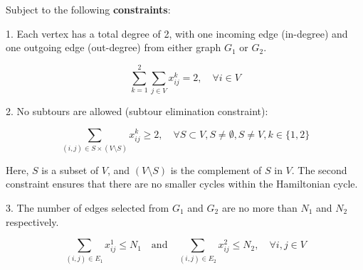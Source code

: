 \documentclass[11pt]{article}
\begin{document}
Subject to the following \textbf{constraints}:

1. Each vertex has a total degree of 2, with one incoming edge (in-degree) and one outgoing edge (out-degree) from either graph $G_1$ or $G_2$.

\begin{equation*}
  \sum_{k=1}^{2} \sum_{j \in V} x_{ij}^k = 2, \quad \forall i \in V
\end{equation*}

2. No subtours are allowed (subtour elimination constraint):

\begin{equation*}
  \sum_{(i,j) \in S \times (V \setminus S)} x_{ij}^k \geq 2, \quad \forall S \subset V, S \neq \emptyset, S \neq V, k \in \{1, 2\}
\end{equation*}

Here, $S$ is a subset of $V$, and $(V \setminus S)$ is the complement of $S$ in $V$. The second constraint ensures that there are no smaller cycles within the Hamiltonian cycle.

3. The number of edges selected from $G_1$ and $G_2$ are no more than $N_1$ and $N_2$ respectively.

\begin{equation*}
  \sum_{(i,j) \in E_1} x_{ij}^1 \leq N_1 \quad \text{and} \quad \sum_{(i,j) \in E_2} x_{ij}^2 \leq N_2,  \quad \forall i,j \in V
\end{equation*}
\\
\end{document}
